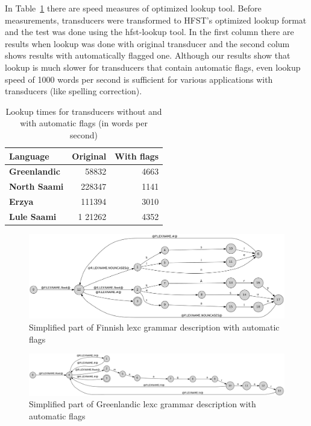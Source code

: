 \documentclass[11pt]{article}
\begin{document}
In Table~\ref{table:speed} there are speed measures of optimized
lookup tool. Before measurements, transducers were transformed to
HFST's optimized lookup format and the test was done using the
hfst-lookup tool. In the first column there are results when lookup
was done with original transducer and the second colum shows results 
with automatically flagged one. Although our results show that lookup 
is much slower for transducers that contain automatic flags, even lookup speed
of 1000 words per second is sufficient for various applications with transducers
(like spelling correction).

\begin{table}
    \centering
    \begin{tabular}{|l|r|r|}
        \hline
        \bf Language & \bf Original & \bf With flags \\
        \hline
        \bf Greenlandic & 58832 & 4663\\
        \bf North Saami & 228347  & 1141 \\
        \bf Erzya & 111394  & 3010\\
        \bf Lule Saami & 1 21262 & 4352 \\
        \hline
    \end{tabular}
    \caption{Lookup times for transducers without and with automatic flags (in words per second)
    \label{table:speed}}
\end{table}

\begin{figure}
    \includegraphics[width=\textwidth]{transducer.png}
     \caption{Simplified part of Finnish lexc grammar description with automatic flags
     \label{fig:lexc-fin-flag}}
\end{figure}

\begin{figure}
    \includegraphics[width=\textwidth]{gr.png}
     \caption{Simplified part of Greenlandic lexc grammar description with automatic flags
     \label{fig:lexc-gr-flag}}
\end{figure}
\end{document}
